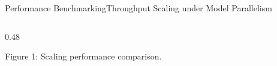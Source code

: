 \begin{frame}{Performance Benchmarking}{Throughput Scaling under Model Parallelism}
\begin{columns}[T]
\begin{column}{0.48\textwidth}
      \par\vspace{0.1cm}
      {\scriptsize\textcolor{textDark!70}{Figure 1: Scaling performance comparison.}}
    \end{column}
  \end{columns}
\end{frame}
